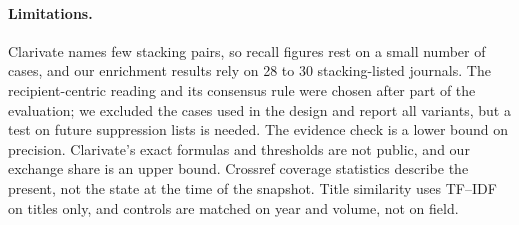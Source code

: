 \paragraph{Limitations.}
Clarivate names few stacking pairs, so recall figures rest on a small number of cases, and our enrichment results rely
on 28 to 30 stacking-listed journals. The recipient-centric reading and its consensus rule were chosen after part of
the evaluation; we excluded the cases used in the design and report all variants, but a test on future suppression
lists is needed. The evidence check is a lower bound on precision. Clarivate's exact formulas and thresholds are not
public, and our exchange share is an upper bound. Crossref coverage statistics describe the present, not the state at
the time of the snapshot. Title similarity uses TF--IDF on titles only, and controls are matched on year and volume,
not on field.


